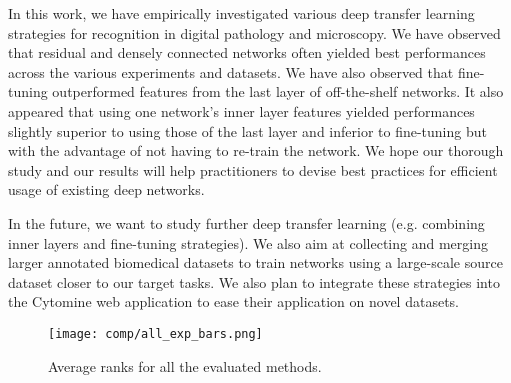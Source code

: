 In this work, we have empirically investigated various deep transfer learning strategies for recognition in digital pathology and microscopy. 
We have observed that residual and densely connected networks often yielded best performances across the various experiments and datasets. We have also observed that fine-tuning outperformed features from the last layer of off-the-shelf networks. It also appeared that using one network's inner layer features yielded performances slightly superior to using those of the last layer and inferior to fine-tuning but with the advantage of not having to re-train the network. We hope our thorough study and our results will help practitioners to devise best practices for efficient usage of existing deep networks. 

In the future, we want to study further deep transfer learning (e.g. combining inner layers and fine-tuning strategies). We also aim at collecting and merging larger annotated biomedical datasets to train networks using a large-scale source dataset closer to our target tasks.  We also plan to integrate these strategies into the Cytomine \parencite{maree2016collaborative} web application to ease their application on novel datasets.



\begin{figure}
  \center 
  \texttt{[image: comp/all\_exp\_bars.png]}
  \caption{Average ranks for all the evaluated methods.}
  \label{fig:comp:res_avg_ranks_all_methods}
\end{figure}